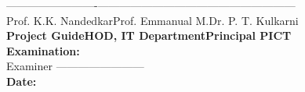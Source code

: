 \large{-------------------------}\hspace*{0.4in}\large{---------------------------}\hspace*{0.4in}\large{---------------------------}\\
\hspace*{0.21in}\large{Prof. K.K. Nandedkar}\hspace*{0.4in}\large{Prof. Emmanual M.}\hspace*{0.65in}\large{Dr. P. T. Kulkarni}\\[0.3cm]
\hspace*{0.21in}\textbf{Project Guide}\hspace*{0.90in}\textbf{HOD, IT Department}\hspace*{0.55in}\textbf{Principal PICT}\\[0.5cm]
\Large{\textbf{Examination:}}\\[0.8cm]
\large{Examiner ------------------------}\\[0.8cm]
\Large{\textbf{Date:}}
\newpage
